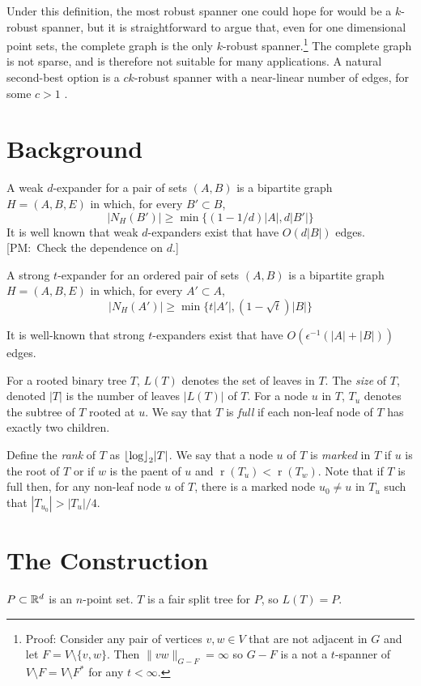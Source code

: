 \documentclass{patmorin}
\newcommand{\note}[2]{{\color{red}[#1:~#2]}}
\DeclareMathOperator{\rank}{r}
\begin{document}
Under this definition, the most robust spanner one could hope for
would be a $k$-robust spanner, but it is straightforward to argue
that, even for one dimensional point sets, the complete graph is the
only $k$-robust spanner.\footnote{Proof: Consider any pair of vertices
$v,w\in V$ that are not adjacent in $G$ and let $F=V\setminus\{v,w\}$.
Then $\|vw\|_{G-F}=\infty$ so $G-F$ is a not a $t$-spanner of $V\setminus
F=V\setminus F^*$ for any $t<\infty$.} The complete graph is not sparse,
and is therefore not suitable for many applications. A natural second-best
option is a $ck$-robust spanner with a near-linear number of edges,
for some $c>1$ .

\section{Background}

A weak $d$-expander for a pair of sets $(A,B)$ is a bipartite graph
$H=(A,B,E)$ in which, for every $B'\subset B$,
\[
	|N_H(B')| \ge \min\{(1-1/d)|A|, d|B'|\}
\]
It is well known that weak $d$-expanders exist that have $O(d|B|)$ edges.\note{PM}{Check the dependence on $d$.}

A strong $t$-expander for an ordered pair of sets $(A,B)$ is a bipartite graph $H=(A,B,E)$ in which, for every $A'\subset A$,
\[
	|N_H(A')| \ge \min\{t|A'|,(1-\sqrt{t})|B|\}
\]

It is well-known that strong $t$-expanders exist that have $O(\epsilon^{-1}(|A|+|B|))$
edges.


For a rooted binary tree $T$, $L(T)$ denotes the set of leaves in $T$. The
\emph{size} of $T$, denoted $|T|$ is the number of leaves $|L(T)|$
of $T$. For a node $u$ in $T$, $T_u$ denotes the subtree of $T$ rooted
at $u$.  We say that $T$ is \emph{full} if each non-leaf node of $T$
has exactly two children.

Define the \emph{rank} of $T$ as ${\lfloor \log \rfloor}_2|T|$.  We say that a node
$u$ of $T$ is \emph{marked} in $T$ if $u$ is the root of $T$ or if $w$
is the paent of $u$ and $\rank(T_u)<\rank(T_w)$.  Note that if $T$
is full then, for any non-leaf node $u$ of $T$, there is a marked node
$u_0\neq u$ in $T_u$ such that $|T_{u_0}|> |T_u|/4$.



\section{The Construction}

$P\subset \mathbb{R}^d$ is an $n$-point set.  $T$ is a fair split tree for $P$,
so $L(T)=P$.
\end{document}
